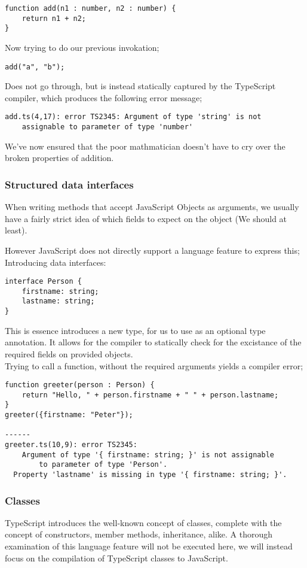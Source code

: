 \begin{verbatim}
function add(n1 : number, n2 : number) {
    return n1 + n2;
}
\end{verbatim}
Now trying to do our previous invokation;
\begin{verbatim}
add("a", "b");
\end{verbatim}
Does not go through, but is instead statically captured by the TypeScript compiler, which produces the following error message;
\begin{verbatim}
add.ts(4,17): error TS2345: Argument of type 'string' is not
    assignable to parameter of type 'number'
\end{verbatim}
We've now ensured that the poor mathmatician doesn't have to cry over the broken properties of addition.

\subsubsection*{Structured data interfaces}
When writing methods that accept JavaScript Objects as arguments,
we usually have a fairly strict idea of which fields to expect on the object
(We should at least).

However JavaScript does not directly support a language feature to express this; Introducing data interfaces:
\begin{verbatim}
interface Person {
    firstname: string;
    lastname: string;
}
\end{verbatim}
This is essence introduces a new type, for us to use as an optional type annotation.
It allows for the compiler to statically check for the excistance of the required fields on provided objects.
\\
Trying to call a function, without the required arguments yields a compiler error;
\begin{verbatim}
function greeter(person : Person) {
    return "Hello, " + person.firstname + " " + person.lastname;
}
greeter({firstname: "Peter"});

------
greeter.ts(10,9): error TS2345:
    Argument of type '{ firstname: string; }' is not assignable
        to parameter of type 'Person'.
  Property 'lastname' is missing in type '{ firstname: string; }'.
\end{verbatim}

\subsubsection*{Classes}
TypeScript introduces the well-known concept of classes, complete with the concept of constructors, member methods, inheritance, alike.
A thorough examination of this language feature will not be executed here, we will instead focus on the compilation of TypeScript classes to JavaScript.

